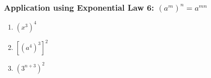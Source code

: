             \subsubsection{ Application using Exponential Law 6: ${\left({a}^{m}\right)}^{n}={a}^{mn}$ }
            \nopagebreak
        \label{m38359*id66924}\begin{enumerate}[noitemsep, label=\textbf{\arabic*}. ] 
            \label{m38359*uid36}\item 
            \begin{math}{\left({x}^{3}\right)}^{4}\end{math}
      \label{m38359*uid37}\item 
        \begin{math}{\left[{\left({a}^{4}\right)}^{3}\right]}^{2}\end{math}
      \label{m38359*uid38}\item 
        \begin{math}{\left({3}^{n+3}\right)}^{2}\end{math}
\newline
\newline
          \end{enumerate}
\label{m38359*eip-323}\par
            \label{m38359*secfhsst!!!underscore!!!id41}\vspace{.5cm} 
      \noindent
